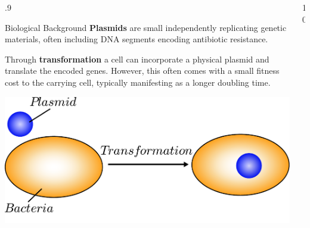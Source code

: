 \documentclass[final]{beamer}
\newlength{\sepwid}
\newlength{\onecolwid}
\newlength{\figwid}
\begin{document}
\begin{frame}[t]
\begin{block}
\begin{columns}[t]
\begin{column}{.9\onecolwid}
  \begin{alertblock}{Biological Background}
    \textbf{Plasmids} are small independently replicating genetic materials,
    often including DNA segments encoding antibiotic resistance.

    \quad\quad Through \textbf{transformation} a cell can incorporate
    a physical plasmid and translate the encoded genes. However, this often
    comes with a small fitness cost to the carrying cell, typically manifesting
    as a longer doubling time.

    \vspace{2ex}

    \begin{center}
      \includegraphics[width=.8\figwid]{../dev/graphics/poster/transformation.pdf}
    \end{center}
  \end{alertblock}
\end{column}

\begin{column}{10\sepwid}\end{column} %


\end{columns}
\end{block}
\end{frame}
\end{document}
